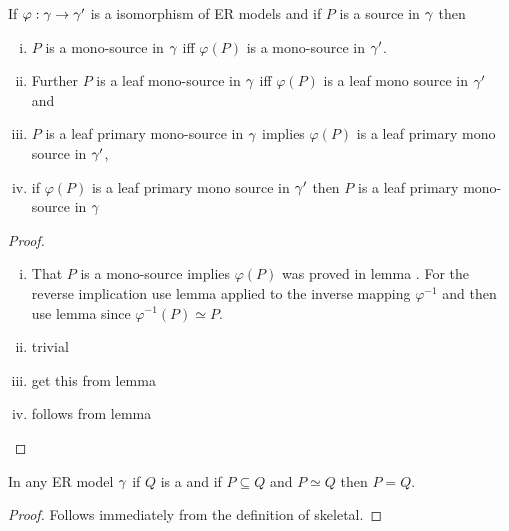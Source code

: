 \begin{lemma}
If $\varphi: \gamma \rightarrow \gamma'$ is a isomorphism of ER models and
if $P$ is a source in $\gamma$ then 
\begin{enumerate}[(i)]
\item
$P$ is a mono-source in $\gamma$ iff  $\varphi(P)$ is a mono-source in $\gamma'$. 
\item
Further  $P$ is a leaf mono-source in $\gamma$ iff $\varphi(P)$ is a leaf mono source in $\gamma'$ and 
\item
$P$ is a leaf primary mono-source in $\gamma$ implies  $\varphi(P)$ is a leaf primary mono source in $\gamma'$,
\item
{}
if $\varphi(P)$ is a leaf primary mono source in $\gamma'$ then $P$ is a leaf primary mono-source in $\gamma$
\end{enumerate}
\end{lemma}
\begin{proof}

\begin{enumerate} [(i)]
\item
That $P$ is a mono-source implies $\varphi(P)$ was proved
in lemma . For the reverse implication use 
lemma  applied to the inverse mapping $\varphi^{-1}$
and then use lemma  since $\varphi^{-1}(P) \simeq P$.
\item
trivial
\item
get this from lemma  
\item
follows from lemma 
\end{enumerate}

\end{proof}

\begin{lemma}
In any ER model $\gamma$ if $Q$ is a  and if $P \subseteq Q$ and $P \simeq Q$ then $P=Q$.
\end{lemma}
\begin{proof}
Follows immediately from the definition of skeletal.
\end{proof}


